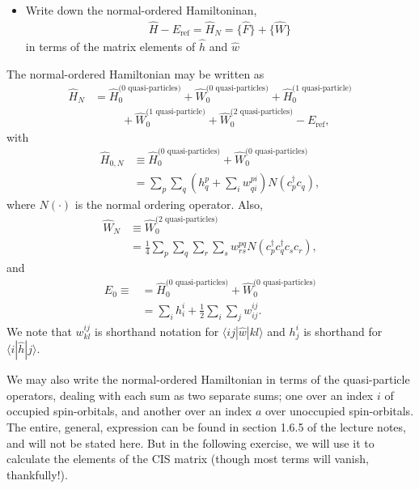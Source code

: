 \documentclass[a4paper]{article}
\newcommand{\nn}{\nonumber}
\begin{document}
\begin{exframe}
\begin{itemize}
  \item[\phantom{2b)}] Write down the normal-ordered Hamiltoninan,
  \begin{align}
  \hat{H}-E_\text{ref} = \hat{H}_N = \{\hat{F}\} + \{\hat{W}\}
  \end{align}
  in terms of the matrix elements of $\hat{h}$ and $\hat{w}$
\end{itemize}
\end{exframe}
The normal-ordered Hamiltonian may be written as
\begin{align}
\hat{H}_N &= \hat{H}_0^{\text{(0 quasi-particles)}} + \hat{W}_0^{\text{(0 quasi-particles)}} + \hat{H}_0^{\text{(1 quasi-particle)}}\nn\\
& \ \ \ \ \ \ \ \ \ \ \  + \hat{W}_0^{\text{(1 quasi-particle)}} + \hat{W}_0^{\text{(2 quasi-particles)}} -E_\text{ref},
\end{align}
with 
\begin{align}
 \hat{H}_{0,N} &\equiv \hat{H}_0^{\text{(0 quasi-particles)}} + \hat{W}_0^{\text{(0 quasi-particles)}}\nn\\
&= \sum_p\sum_q \left(h^p_q + \sum_i w^{pi}_{qi} \right) N(c_p^\dagger c_q),
\end{align}
where $N(\cdot)$ is the normal ordering operator. Also, 
\begin{align}
\hat{W}_N &\equiv \hat{W}_0^{\text{(2 quasi-particles)}} \nn\\
&= \frac{1}{4}\sum_p \sum_q \sum_r \sum_s w^{pq}_{rs} N(c_p^\dagger c_q^\dagger c_s c_r),
\end{align}
and 
\begin{align}
E_0 \equiv &= \hat{H}_0^{\text{(0 quasi-particles)}} + \hat{W}_0^{\text{(0 quasi-particles)}} \nn\\
&= \sum_i h^i_i + \frac{1}{2} \sum_i \sum_j w^{ij}_{ij}.
\end{align}
We note that $w^{ij}_{kl}$ is shorthand notation for $\langle i j| \hat{w}|k l\rangle$ and $h^i_j$ is shorthand for $\langle i | \hat{h} | j \rangle$.

We may also write the normal-ordered Hamiltonian in terms of the quasi-particle operators, dealing with each sum as two separate sums; one over an index $i$ of occupied spin-orbitals, and another over an index $a$ over unoccupied spin-orbitals. The entire, general, expression can be found in section 1.6.5 of the lecture notes, and will not be stated here. But in the following exercise, we will use it to calculate the elements of the CIS matrix (though most terms will vanish, thankfully!).
\end{document}
